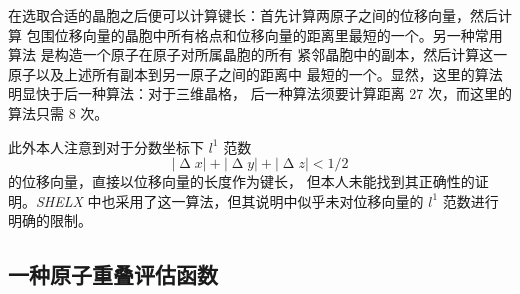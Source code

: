 \begin{figure}[htbp!]\bfcmd
\setlength{\columnsep}{2.5em}
\begin{floatrow}
\end{floatrow}
\end{figure}

在选取合适的晶胞之后便可以计算键长：首先计算两原子之间的位移向量，然后计算
包围位移向量的晶胞中所有格点和位移向量的距离里最短的一个。另一种常用算法%
\parencite{attfield1999, grudinin2010}是构造一个原子在原子对所属晶胞的所有
紧邻晶胞中的副本，然后计算这一原子以及上述所有副本到另一原子之间的距离中
最短的一个。显然，这里的算法明显快于后一种算法：对于三维晶格，
后一种算法须要计算距离 27 次，而这里的算法只需 8 次。

此外本人注意到对于分数坐标下 $l^1$ 范数
\begin{equation}
	|\upDelta x| + |\upDelta y| + |\upDelta z| < 1 / 2
\end{equation}
的位移向量，\textcite{kshirsagar2015}直接以位移向量的长度作为键长，
但本人未能找到其正确性的证明。\emph{SHELX}\parencite{sheldrick2010}%
中也采用了这一算法，但其说明中似乎未对位移向量的 $l^1$ 范数进行明确的限制。

\subsection{一种原子重叠评估函数}\label{ssec:eval-func}

